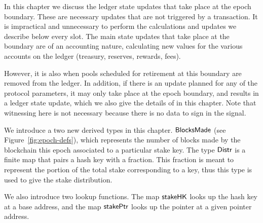\newcommand{\UTxOEpState}{\type{UTxOEpState}}
\newcommand{\Accnt}{\type{Accnt}}
\newcommand{\AccntEnv}{\type{AccntEnv}}
\newcommand{\AccntState}{\type{AccntState}}
\newcommand{\StPlCleanEnv}{\type{StPlCleanEnv}}
\newcommand{\StPlCleanState}{\type{StPlCleanState}}
\newcommand{\NewProtoConstsEnv}{\type{NewProtoConstsEnv}}
\newcommand{\NewProtoConstsState}{\type{NewProtoConstsState}}
\newcommand{\EpochEnv}{\type{EpochEnv}}
\newcommand{\EpochState}{\type{EpochState}}
\newcommand{\BlocksMade}{\type{BlocksMade}}
\newcommand{\Distr}{\type{Distr}}

\newcommand{\obligation}[4]{\fun{obligation}~ \var{#1}~ \var{#2}~ \var{#3}~ \var{#4}}
\newcommand{\reward}[5]{\fun{reward}~ \var{#1}~ \var{#2}~ \var{#3}~ \var{#4}~ \var{#5}}
\newcommand{\isActive}[4]{\fun{isActive}~ \var{#1}~ \var{#2}~ \var{#3}~ \var{#4}}
\newcommand{\activeStake}[5]{\fun{activeStake}~ \var{#1}~ \var{#2}~ \var{#3}~ \var{#4}~ \var{#5}}
\newcommand{\poolRefunds}[3]{\fun{poolRefunds}~ \var{#1}~ \var{#2}~ \var{#3}}

In this chapter we discuss the ledger state updates that take place at the epoch
boundary. These are necessary updates that are not triggered by a transaction.
It is impractical and unnecessary to perform the calculations and updates we
describe below every slot. The main state updates that take place at the boundary
are of an accounting nature, calculating new values for the various accounts
on the ledger (treasury, reserves, rewards, fees).

However, it is also when
pools scheduled for retirement at this boundary are removed from the ledger.
In addition, if there is an update planned for any of the protocol parameters,
it may only take place at the epoch boundary, and results in a ledger state
update, which we also give the details of in this chapter.
Note that witnessing here is not necessary because there is no data to sign
in the signal.

We introduce a two new derived types in this chapter. $\BlocksMade$ (see
Figure~\ref{fig:epoch-defs}), which represents the number of blocks made by
the blockchain this epoch associated to a particular stake key. The type
$\Distr$ is a finite map that pairs a hash key with a fraction. This fraction
is meant to represent the portion of the total stake corresponding to a key,
thus this type is used to give the stake distribution.

We also introduce two lookup functions. The map $\mathsf{stakeHK}$ looks up the
hash key at a base address, and the map $\mathsf{stakePtr}$ looks up the pointer
at a given pointer address.

